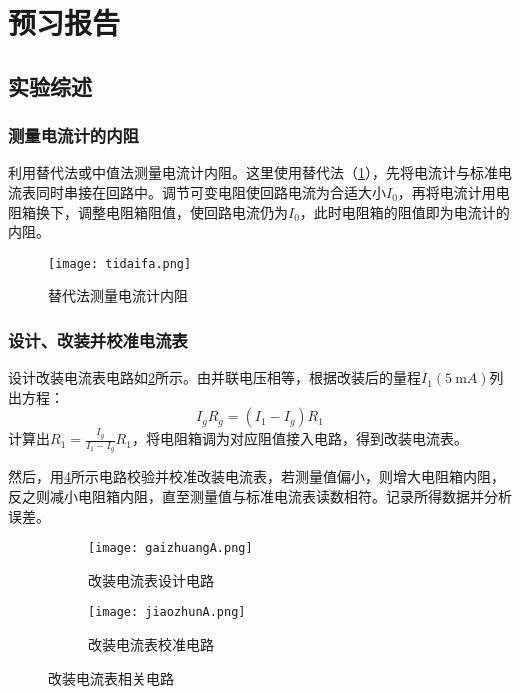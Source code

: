 \documentclass[]{../template/Report}
\begin{document}
\makecover

\section{预习报告}
\subsection{实验综述}
\subsubsection{测量电流计的内阻}
    利用替代法或中值法测量电流计内阻。这里使用替代法（\cref{tidaifa}），先将电流计与标准电流表同时串接在回路中。调节可变电阻使回路电流为合适大小$I_0$，再将电流计用电阻箱换下，调整电阻箱阻值，使回路电流仍为$I_0$，此时电阻箱的阻值即为电流计的内阻。
    \begin{figure}[htbp]
        \centering
        \texttt{[image: tidaifa.png]}
        \caption{替代法测量电流计内阻}
        \label{tidaifa}
    \end{figure}

\subsubsection{设计、改装并校准电流表}
    设计改装电流表电路如\cref{gaizhuangA}所示。由并联电压相等，根据改装后的量程$I_1 (\SI{5}{\milli A})$列出方程：
    \begin{equation}
        I_g R_g = (I_1 - I_g) R_1
    \end{equation}
    计算出$R_1 = \frac{I_g}{I_1-I_g} R_1$，将电阻箱调为对应阻值接入电路，得到改装电流表。

    然后，用\cref{jiaozhunA}所示电路校验并校准改装电流表，若测量值偏小，则增大电阻箱内阻，反之则减小电阻箱内阻，直至测量值与标准电流表读数相符。记录所得数据并分析误差。
    \begin{figure}[htbp]
        \centering
        \begin{subfigure}[b]{0.45\textwidth}
            \texttt{[image: gaizhuangA.png]}
            \caption{改装电流表设计电路}
            \label{gaizhuangA}
        \end{subfigure}
        \hfill
        \begin{subfigure}[b]{0.45\textwidth}
            \texttt{[image: jiaozhunA.png]}
            \caption{改装电流表校准电路}
            \label{jiaozhunA}
        \end{subfigure}
    \caption{改装电流表相关电路}
    \end{figure}
\end{document}
